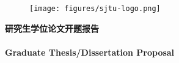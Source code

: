 \documentclass[a4paper,zihao=-4,AutoFakeBold]{ctexart}
\begin{document}
\pagestyle{empty}

\begin{figure}[h]
    \centering
    \texttt{[image: figures/sjtu-logo.png]}
\end{figure}

\begin{center}
    \vspace{-0.5cm}
    {\songti\bfseries 研究生学位论文开题报告}\\~\\
    {\bfseries Graduate Thesis/Dissertation Proposal}
    \vspace{0.5cm}
\end{center}


\end{document}
